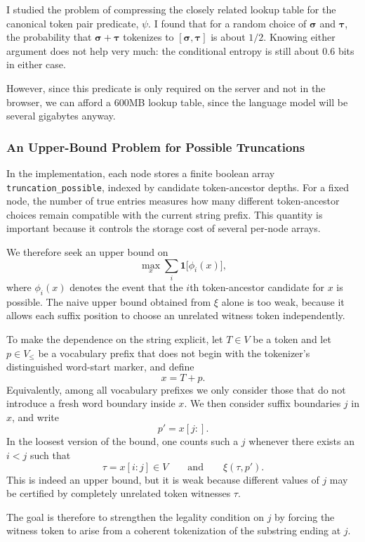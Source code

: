 I studied the problem of compressing the closely related
lookup table for the canonical token pair predicate, $\psi$.
I found that for a random choice of $\boldsymbol{\sigma}$ and $\boldsymbol{\tau}$, the probability that $\boldsymbol{\sigma} + \boldsymbol{\tau}$ tokenizes to $[\boldsymbol{\sigma}, \boldsymbol{\tau}]$ is about $1/2$.
Knowing either argument does not help very much: the conditional entropy is still about $0.6$ bits in either case.

However, since this predicate is only required on the server and not in the browser, we can afford a 600MB lookup table,
since the language model will be several gigabytes anyway.

\subsubsection{An Upper-Bound Problem for Possible Truncations}
\label{sec:upper-bound-truncation-possible}
In the implementation, each node stores a finite boolean array
\texttt{truncation\_possible}, indexed by candidate token-ancestor depths.
For a fixed node, the number of true entries measures how many different
token-ancestor choices remain compatible with the current string prefix.
This quantity is important because it controls the storage cost of several
per-node arrays.

We therefore seek an upper bound on
\[
    \max_x \sum_i \mathbf{1}\bigl[\phi_i(x)\bigr],
\]
where $\phi_i(x)$ denotes the event that the $i$th token-ancestor candidate
for $x$ is possible. The naive upper bound obtained from $\xi$ alone is too
weak, because it allows each suffix position to choose an unrelated witness
token independently.

To make the dependence on the string explicit, let $T \in V$ be a token and
let $p \in V_\leq$ be a vocabulary prefix that does not begin with the
tokenizer's distinguished word-start marker, and define
\[
    x = T + p.
\]
Equivalently, among all vocabulary prefixes we only consider those that do not
introduce a fresh word boundary inside $x$.
We then consider suffix boundaries $j$ in $x$, and write
\[
    p' = x[j:].
\]
In the loosest version of the bound, one counts such a $j$ whenever there
exists an $i < j$ such that
\[
    \tau = x[i:j] \in V
    \qquad\text{and}\qquad
    \xi(\tau, p').
\]
This is indeed an upper bound, but it is weak because different values of $j$
may be certified by completely unrelated token witnesses $\tau$.

The goal is therefore to strengthen the legality condition on $j$ by forcing
the witness token to arise from a coherent tokenization of the substring ending
at $j$.

